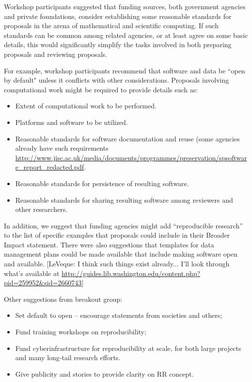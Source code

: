 \documentclass[11pt]{article}
\newcommand{\comment}[1]{{\color{blue} [#1]}}
\newcommand{\comment}[1]{}
\begin{document}
Workshop participants suggested that funding sources, both government
agencies and private foundations, consider establishing some reasonable
standards for proposals in the arena of mathematical and scientific
computing.  If such standards can be common among related agencies, or at
least agree on some basic details, this would significantly simplify the
tasks involved in both preparing proposals and reviewing proposals.

For example, workshop participants recommend that software and data be ``open
by default" unless it conflicts with other considerations. 
Proposals involving computational work might
be required to provide details such as:

\begin{itemize} 
\item Extent of computational work to be performed.
\item Platforms and software to be utilized.
\item Reasonable standards for software documentation and reuse (some agencies
already have such requirements 
\url{http://www.jisc.ac.uk/media/documents/programmes/preservation/spsoftware_report_redacted.pdf}.
\item Reasonable standards for persistence of resulting software.
\item Reasonable standards for sharing resulting software among reviewers and
other researchers.
\end{itemize} 


In addition, we suggest that funding
agencies might add ``reproducible research'' to the list of specific examples
that proposals could include in their Broader Impact statement. There were
also suggestions that templates for data management plans could be made
available that include making software open and available.
\comment{LeVeque: I think such things exist already... I'll look through
what's available at
\url{http://guides.lib.washington.edu/content.php?pid=259952&sid=2660743}}

Other suggestions from breakout group: 
\begin{itemize} 
\item    Set default to open – encourage statements from societies
and others;
\item    Fund training workshops on reproducibility;
\item    Fund cyberinfrastructure for reproducibility at scale, for
both large projects and many long-tail research efforts.
\item    Give publicity and stories to provide clarity on RR concept.
\end{itemize} 
\end{document}
